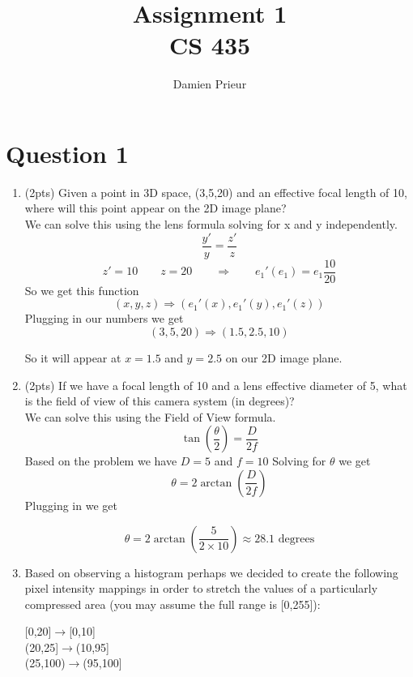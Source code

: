 \documentclass{article}
\author{Damien Prieur}
\title{Assignment 1 \\ CS 435}
\date{}
\begin{document}
\maketitle

\section*{Question 1}
\begin{enumerate}
\item (2pts) Given a point in 3D space, (3,5,20) and an effective focal length of 10, where will this point appear on the 2D image plane?
\\
We can solve this using the lens formula solving for x and y independently.
$$ \frac{y'}{y} = \frac{z'}{z} $$
$$ z' = 10 \qquad z = 20 \qquad \Rightarrow \qquad e_1'(e_1) = e_1 \frac{10}{20} $$
So we get this function
$$ (x,y,z) \Rightarrow (e_1'(x), e_1'(y), e_1'(z)) $$
Plugging in our numbers we get
$$ (3,5,20) \Rightarrow (1.5,2.5,10) $$

So it will appear at $ x = 1.5 $ and $ y = 2.5 $ on our 2D image plane.


\item (2pts) If we have a focal length of 10 and a lens effective diameter of 5, what is the field of view of this camera system (in degrees)?
\\
We can solve this using the Field of View formula.
$$ \tan\left(\frac{\theta}{2}\right)=\frac{D}{2f} $$
Based on the problem we have $D = 5 $ and $ f = 10 $
Solving for $\theta$ we get
$$ \theta = 2\arctan\left(\frac{D}{2f}\right) $$
Plugging in we get

$$ \theta = 2\arctan\left(\frac{5}{2\times10}\right) \approx 28.1\text{ degrees}$$

\item   Based on observing a histogram perhaps we decided to create the following pixel intensity mappings in order to stretch the values of a particularly compressed area (you may assume the full range is [0,255]):\\

\begin{center}
[0,20]$\rightarrow$[0,10]\\
(20,25]$\rightarrow$(10,95]\\
(25,100)$\rightarrow$(95,100]
\end{center}


\end{enumerate}
\end{document}
